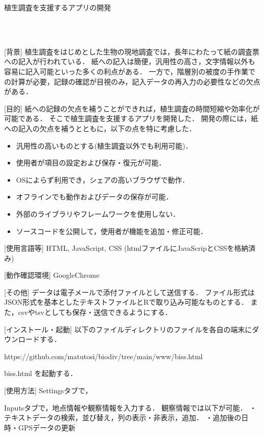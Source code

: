 \documentclass[11pt]{jsarticle}
\begin{document}
\Large

\centerline{植生調査を支援するアプリの開発}

　\\[-12mm]

\normalsize
{}

　\\[-8mm]

[背景]
植生調査をはじめとした生物の現地調査では，長年にわたって紙の調査票への記入が行われている．
紙への記入は簡便，汎用性の高さ，文字情報以外も容易に記入可能といった多くの利点がある．
一方で，階層別の被度の手作業での計算が必要，記録の確認が目視のみ，記入データの再入力の必要性などの欠点がある．

[目的]
紙への記録の欠点を補うことができれば，植生調査の時間短縮や効率化が可能である．
そこで植生調査を支援するアプリを開発した．
開発の際には，紙への記入の欠点を補うとともに，以下の点を特に考慮した．
\begin{itemize}
\item 汎用性の高いものとする(植生調査以外でも利用可能)．
\item 使用者が項目の設定および保存・復元が可能．
\item OSによらず利用でき，シェアの高いブラウザで動作．
\item オフラインでも動作およびデータの保存が可能．
\item 外部のライブラリやフレームワークを使用しない．
\item ソースコードを公開して，使用者が機能を追加・修正可能．
\end{itemize}

[使用言語等]
HTML, JavaScript, CSS (htmlファイルにJavaScripとCSSを格納済み)

[動作確認環境]
GoogleChrome

[その他]
データは電子メールで添付ファイルとして送信する．
ファイル形式はJSON形式を基本としたテキストファイルとRで取り込み可能なものとする．
また，csvやtsvとしても保存・送信できるようにする．


[インストール・起動]
以下のファイルディレクトリのファイルを各自の端末にダウンロードする．

https://github.com/matutosi/biodiv/tree/main/www/biss.html

biss.html を起動する．


[使用方法]
Settingsタブで，

Inputsタブで，地点情報や観察情報を入力する．
観察情報では以下が可能．
・テキストデータの検索，並び替え，列の表示・非表示，追加．
・追加後の日時・GPSデータの更新
\end{document}
